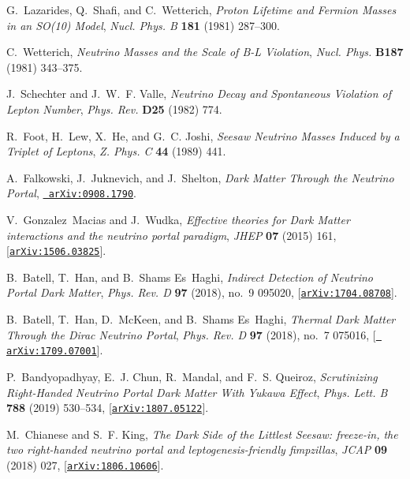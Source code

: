 \documentclass[prd,nofootinbib,preprint,superscriptaddress]{revtex4}
\begin{document}
\begin{thebibliography}{100}
G.~Lazarides, Q.~Shafi, and C.~Wetterich, {\it {Proton Lifetime and Fermion
  Masses in an SO(10) Model}},  {\em Nucl. Phys. B} {\bf 181} (1981) 287--300.

C.~Wetterich, {\it {Neutrino Masses and the Scale of B-L Violation}},  {\em
  Nucl. Phys.} {\bf B187} (1981) 343--375.

J.~Schechter and J.~W.~F. Valle, {\it {Neutrino Decay and Spontaneous Violation
  of Lepton Number}},  {\em Phys. Rev.} {\bf D25} (1982) 774.

R.~Foot, H.~Lew, X.~He, and G.~C. Joshi, {\it {Seesaw Neutrino Masses Induced
  by a Triplet of Leptons}},  {\em Z. Phys. C} {\bf 44} (1989) 441.

A.~Falkowski, J.~Juknevich, and J.~Shelton, {\it {Dark Matter Through the
  Neutrino Portal}},  \href{http://arxiv.org/abs/0908.1790}{{\tt
  arXiv:0908.1790}}.

V.~Gonzalez~Macias and J.~Wudka, {\it {Effective theories for Dark Matter
  interactions and the neutrino portal paradigm}},  {\em JHEP} {\bf 07} (2015)
  161, [\href{http://arxiv.org/abs/1506.03825}{{\tt arXiv:1506.03825}}].

B.~Batell, T.~Han, and B.~Shams Es~Haghi, {\it {Indirect Detection of Neutrino
  Portal Dark Matter}},  {\em Phys. Rev. D} {\bf 97} (2018), no.~9 095020,
  [\href{http://arxiv.org/abs/1704.08708}{{\tt arXiv:1704.08708}}].

B.~Batell, T.~Han, D.~McKeen, and B.~Shams Es~Haghi, {\it {Thermal Dark Matter
  Through the Dirac Neutrino Portal}},  {\em Phys. Rev. D} {\bf 97} (2018),
  no.~7 075016, [\href{http://arxiv.org/abs/1709.07001}{{\tt
  arXiv:1709.07001}}].

P.~Bandyopadhyay, E.~J. Chun, R.~Mandal, and F.~S. Queiroz, {\it {Scrutinizing
  Right-Handed Neutrino Portal Dark Matter With Yukawa Effect}},  {\em Phys.
  Lett. B} {\bf 788} (2019) 530--534,
  [\href{http://arxiv.org/abs/1807.05122}{{\tt arXiv:1807.05122}}].

M.~Chianese and S.~F. King, {\it {The Dark Side of the Littlest Seesaw:
  freeze-in, the two right-handed neutrino portal and leptogenesis-friendly
  fimpzillas}},  {\em JCAP} {\bf 09} (2018) 027,
  [\href{http://arxiv.org/abs/1806.10606}{{\tt arXiv:1806.10606}}].


\end{thebibliography}
\end{document}
